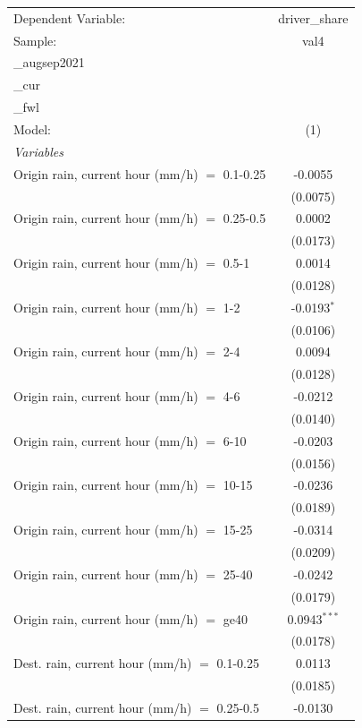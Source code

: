 \ifdefined\ifclassloaded
{}
\fi
\begingroup
\centering
\begin{tabular}{lc}
   \tabularnewline \midrule \midrule
   Dependent Variable: & driver\_share\\
   Sample: & val4\\_augsep2021\\_cur\\_fwl \\
   Model: & (1)\\
   \midrule
   \emph{Variables}\\
   Origin rain, current hour (mm/h) $=$ 0.1-0.25 & -0.0055\\
    & (0.0075)\\
   Origin rain, current hour (mm/h) $=$ 0.25-0.5 & 0.0002\\
    & (0.0173)\\
   Origin rain, current hour (mm/h) $=$ 0.5-1 & 0.0014\\
    & (0.0128)\\
   Origin rain, current hour (mm/h) $=$ 1-2 & -0.0193$^{*}$\\
    & (0.0106)\\
   Origin rain, current hour (mm/h) $=$ 2-4 & 0.0094\\
    & (0.0128)\\
   Origin rain, current hour (mm/h) $=$ 4-6 & -0.0212\\
    & (0.0140)\\
   Origin rain, current hour (mm/h) $=$ 6-10 & -0.0203\\
    & (0.0156)\\
   Origin rain, current hour (mm/h) $=$ 10-15 & -0.0236\\
    & (0.0189)\\
   Origin rain, current hour (mm/h) $=$ 15-25 & -0.0314\\
    & (0.0209)\\
   Origin rain, current hour (mm/h) $=$ 25-40 & -0.0242\\
    & (0.0179)\\
   Origin rain, current hour (mm/h) $=$ ge40 & 0.0943$^{***}$\\
    & (0.0178)\\
   Dest. rain, current hour (mm/h) $=$ 0.1-0.25 & 0.0113\\
    & (0.0185)\\
   Dest. rain, current hour (mm/h) $=$ 0.25-0.5 & -0.0130\\

\end{tabular}
